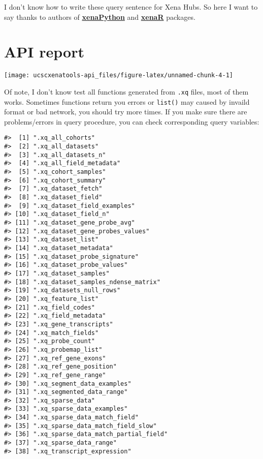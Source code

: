 \documentclass[nofonts,]{tufte-handout}
\begin{document}
I don't know how to write these query sentence for Xena Hubs. So here I
want to say thanks to authors of
\href{https://github.com/ucscXena/xenaPython}{\textbf{xenaPython}} and
\href{https://github.com/mtmorgan/XenaR}{\textbf{xenaR}} packages.

\hypertarget{api-report}{%
\section{API report}\label{api-report}}

\texttt{[image: ucscxenatools-api\_files/figure-latex/unnamed-chunk-4-1]}

Of note, I don't know test all functions generated from \texttt{.xq}
files, most of them works. Sometimes functions return you errors or
\texttt{list()} may caused by invaild format or bad network, you should
try more times. If you make sure there are problems/errors in query
procedure, you can check corresponding query variables:

\begin{verbatim}
#>  [1] ".xq_all_cohorts"                    
#>  [2] ".xq_all_datasets"                   
#>  [3] ".xq_all_datasets_n"                 
#>  [4] ".xq_all_field_metadata"             
#>  [5] ".xq_cohort_samples"                 
#>  [6] ".xq_cohort_summary"                 
#>  [7] ".xq_dataset_fetch"                  
#>  [8] ".xq_dataset_field"                  
#>  [9] ".xq_dataset_field_examples"         
#> [10] ".xq_dataset_field_n"                
#> [11] ".xq_dataset_gene_probe_avg"         
#> [12] ".xq_dataset_gene_probes_values"     
#> [13] ".xq_dataset_list"                   
#> [14] ".xq_dataset_metadata"               
#> [15] ".xq_dataset_probe_signature"        
#> [16] ".xq_dataset_probe_values"           
#> [17] ".xq_dataset_samples"                
#> [18] ".xq_dataset_samples_ndense_matrix"  
#> [19] ".xq_datasets_null_rows"             
#> [20] ".xq_feature_list"                   
#> [21] ".xq_field_codes"                    
#> [22] ".xq_field_metadata"                 
#> [23] ".xq_gene_transcripts"               
#> [24] ".xq_match_fields"                   
#> [25] ".xq_probe_count"                    
#> [26] ".xq_probemap_list"                  
#> [27] ".xq_ref_gene_exons"                 
#> [28] ".xq_ref_gene_position"              
#> [29] ".xq_ref_gene_range"                 
#> [30] ".xq_segment_data_examples"          
#> [31] ".xq_segmented_data_range"           
#> [32] ".xq_sparse_data"                    
#> [33] ".xq_sparse_data_examples"           
#> [34] ".xq_sparse_data_match_field"        
#> [35] ".xq_sparse_data_match_field_slow"   
#> [36] ".xq_sparse_data_match_partial_field"
#> [37] ".xq_sparse_data_range"              
#> [38] ".xq_transcript_expression"
\end{verbatim}
\end{document}
